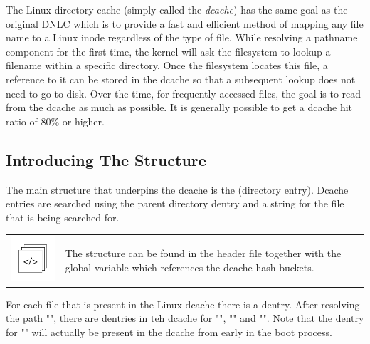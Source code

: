 The Linux directory cache (simply called the \textit{dcache}) has the same goal as the original DNLC which is to provide a fast and efficient method of mapping any file name to a Linux inode regardless of the type of file. While resolving a pathname component for the first time, the kernel will ask the filesystem to lookup a filename within a specific directory. Once the filesystem locates this file, a reference to it can be stored in the dcache so that a subsequent lookup does not need to go to disk. Over the time, for frequently accessed files, the goal is to read from the dcache as much as possible. It is generally possible to get a dcache hit ratio of 80\% or higher.


\subsection{Introducing The  Structure}

The main structure that underpins the dcache is the  (directory entry). Dcache entries are searched using the parent directory dentry and a string for the file that is being searched for.

 \begin{table}[h]
\begin{tabular}{ll}
\parbox[l]{0.6in}{\includegraphics[scale=0.8]{figures/src-xref.pdf}} & \parbox[l]{4in}{\small{The  structure can be found in the  header file together with the global variable  which references the dcache hash buckets.}}
\end{tabular}
\end{table}

 \noindent
 For each file that is present in the Linux dcache there is a dentry. After resolving the path "", there are dentries in teh dcache for "\cf{/}", "" and "". Note that the dentry for "\cf{/}" will actually be present in the dcache from early in the boot process.
 
